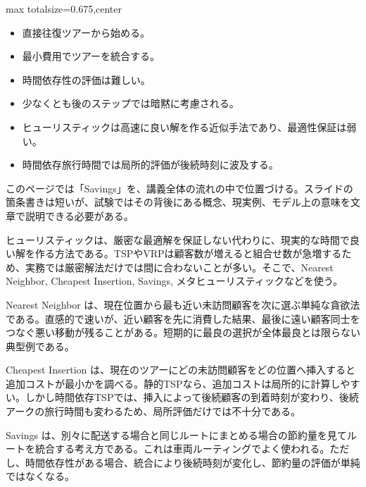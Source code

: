 \clearpage
{}
\begin{adjustbox}{max totalsize={\textwidth}{0.675\textheight},center}
\begin{minipage}{\textwidth}\scriptsize
\begin{minipage}[t]{0.485\textwidth}
\begin{itemize}
\item 直接往復ツアーから始める。
\item 最小費用でツアーを統合する。
\item 時間依存性の評価は難しい。
\item 少なくとも後のステップでは暗黙に考慮される。
\end{itemize}
\begin{itemize}
\item ヒューリスティックは高速に良い解を作る近似手法であり、最適性保証は弱い。
\item 時間依存旅行時間では局所的評価が後続時刻に波及する。
\end{itemize}
\end{minipage}\hfill
\begin{minipage}[t]{0.485\textwidth}
このページでは「Savings」を、講義全体の流れの中で位置づける。スライドの箇条書きは短いが、試験ではその背後にある概念、現実例、モデル上の意味を文章で説明できる必要がある。\par
ヒューリスティックは、厳密な最適解を保証しない代わりに、現実的な時間で良い解を作る方法である。TSPやVRPは顧客数が増えると組合せ数が急増するため、実務では厳密解法だけでは間に合わないことが多い。そこで、Nearest Neighbor, Cheapest Insertion, Savings, メタヒューリスティックなどを使う。\par
Nearest Neighbor は、現在位置から最も近い未訪問顧客を次に選ぶ単純な貪欲法である。直感的で速いが、近い顧客を先に消費した結果、最後に遠い顧客同士をつなぐ悪い移動が残ることがある。短期的に最良の選択が全体最良とは限らない典型例である。\par
Cheapest Insertion は、現在のツアーにどの未訪問顧客をどの位置へ挿入すると追加コストが最小かを調べる。静的TSPなら、追加コストは局所的に計算しやすい。しかし時間依存TSPでは、挿入によって後続顧客の到着時刻が変わり、後続アークの旅行時間も変わるため、局所評価だけでは不十分である。\par
Savings は、別々に配送する場合と同じルートにまとめる場合の節約量を見てルートを統合する考え方である。これは車両ルーティングでよく使われる。ただし、時間依存性がある場合、統合により後続時刻が変化し、節約量の評価が単純ではなくなる。\par

\end{minipage}
\end{minipage}
\end{adjustbox}
